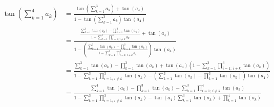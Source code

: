 \documentclass[14pt]{article}
\begin{document}
\begin{enumerate}
        \begin{align*}
            \tan\left(\sum_{k=1}^4a_k\right) &=\frac{\tan\left(\sum_{k=1}^3a_k\right)+\tan(a_4)}{1-\tan\left(\sum_{k=1}^3a_k\right)\tan(a_4)}\\
                          &=\frac{
                                \frac{
                                    \sum_{k=1}^3\tan(a_k)-\prod_{k=1}^3\tan(a_k)
                                    }
                                    {
                                    1-\sum_{k=1}^3\prod_{i=1;\ i\neq k}^3a_k
                                    }
                                    +\tan(a_4)
                                }
                                {
                                1-\left(
                                    \frac
                                    {
                                    \sum_{k=1}^3\tan(a_k)-\prod_{k=1}^3\tan(a_k)
                                    }
                                    {
                                    1-\sum_{k=1}^3\prod_{i=1;\ i\neq k}^3a_k
                                    }\right)\tan(a_4)
                                }\\
                          &=\frac{
                            \sum_{k=1}^3\tan(a_k)-\prod_{k=1}^3\tan(a_k)+\tan(a_4)\left(1-\sum_{k=1}^3\prod_{i=1;\ i\neq k}^3\tan(a_k)\right)
                          }
                          {
                            1-\sum_{k=1}^3\prod_{i=1;\ i\neq k}^3\tan(a_k)-\left(\sum_{k=1}^3\tan(a_k)-\prod_{k=1}^3\tan(a_k)\right)\tan(a_4)
                          }\\
                          &=\frac{
                            \sum_{k=1}^4\tan(a_k)-\prod_{k=1}^3\tan(a_k)-\sum_{k=1}^3\prod_{i=1;\ i\neq k}^4\tan(a_k)
                          }
                          {
                            1-\sum_{k=1}^3\prod_{i=1;\ i\neq k}^3\tan(a_k)-\tan(a_4)\sum_{k=1}^3\tan(a_k)+\prod_{k=1}^4\tan(a_k)
                          }
        \end{align*}
    \end{enumerate}
\end{document}

